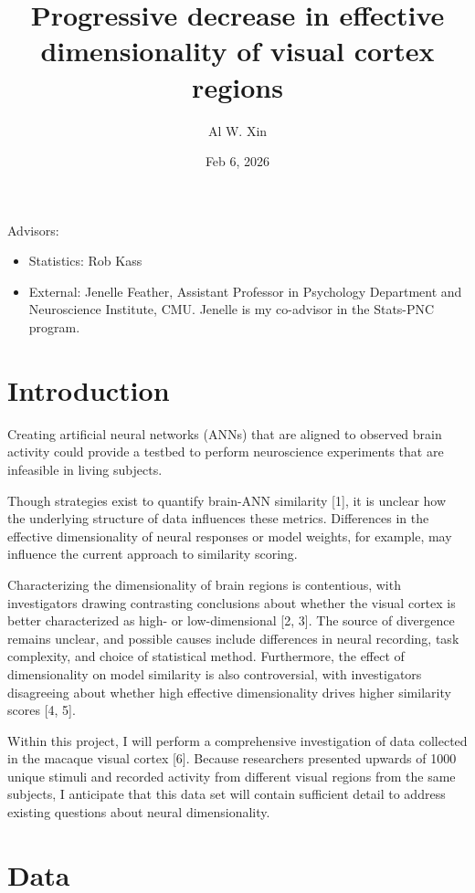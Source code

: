 \documentclass[
  letterpaper,
  DIV=11,
  numbers=noendperiod]{scrartcl}
\title{Progressive decrease in effective dimensionality of visual cortex
regions}
\author{Al W. Xin}
\date{Feb 6, 2026}
\providecommand{\tightlist}{%
  \setlength{\itemsep}{0pt}\setlength{\parskip}{0pt}}
\begin{document}
\maketitle


Advisors:

\begin{itemize}
\tightlist
\item
  Statistics: Rob Kass
\item
  External: Jenelle Feather, Assistant Professor in Psychology
  Department and Neuroscience Institute, CMU. Jenelle is my co-advisor
  in the Stats-PNC program.
\end{itemize}

\section{Introduction}\label{introduction}

Creating artificial neural networks (ANNs) that are aligned to observed
brain activity could provide a testbed to perform neuroscience
experiments that are infeasible in living subjects.

Though strategies exist to quantify brain-ANN similarity {[}1{]}, it is
unclear how the underlying structure of data influences these metrics.
Differences in the effective dimensionality of neural responses or model
weights, for example, may influence the current approach to similarity
scoring.

Characterizing the dimensionality of brain regions is contentious, with
investigators drawing contrasting conclusions about whether the visual
cortex is better characterized as high- or low-dimensional {[}2, 3{]}.
The source of divergence remains unclear, and possible causes include
differences in neural recording, task complexity, and choice of
statistical method. Furthermore, the effect of dimensionality on model
similarity is also controversial, with investigators disagreeing about
whether high effective dimensionality drives higher similarity scores
{[}4, 5{]}.

Within this project, I will perform a comprehensive investigation of
data collected in the macaque visual cortex {[}6{]}. Because researchers
presented upwards of 1000 unique stimuli and recorded activity from
different visual regions from the same subjects, I anticipate that this
data set will contain sufficient detail to address existing questions
about neural dimensionality.

\section{Data}\label{data}
\end{document}
